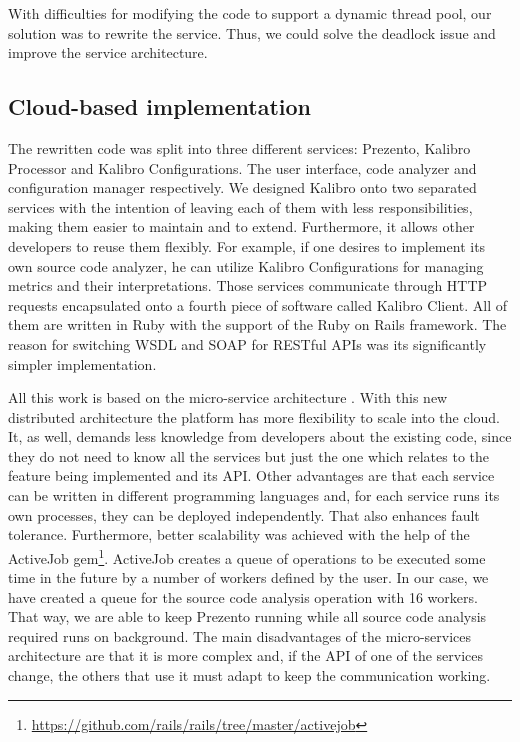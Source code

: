 With difficulties for modifying the code to support a dynamic thread pool, our
solution was to rewrite the service. Thus, we could solve the deadlock issue
and improve the service architecture.

\subsection{Cloud-based implementation}
\label{subsec:cloud-based-implementation}

The rewritten code was split into three different services: Prezento, Kalibro Processor and Kalibro Configurations. The user interface, code analyzer and configuration manager respectively. We designed Kalibro onto two separated services with the intention of leaving each of them with less responsibilities, making them easier to maintain and to extend. Furthermore, it allows other developers to reuse them flexibly. For example, if one desires to implement its own source code analyzer, he can utilize Kalibro Configurations for managing metrics and their interpretations. Those services communicate through HTTP requests encapsulated onto a fourth piece of software called Kalibro Client. All of them are written in Ruby with the support of the Ruby on Rails framework. The reason for switching WSDL and SOAP for RESTful APIs was its significantly simpler implementation.

All this work is based on the micro-service architecture \cite{namiot2014micro}. With this new distributed architecture the platform has more flexibility to scale into the cloud. It, as well, demands less knowledge from developers about the existing code, since they do not need to know all the services but just the one which relates to the feature being implemented and its API. Other advantages are that each service can be written in different programming languages and, for each service runs its own processes, they can be deployed independently. That also enhances fault tolerance. Furthermore, better scalability was achieved with the help of the ActiveJob gem\footnote{\url{https://github.com/rails/rails/tree/master/activejob}}. ActiveJob creates a queue of operations to be executed some time in the future by a number of workers defined by the user. In our case, we have created a queue for the source code analysis operation with 16 workers. That way, we are able to keep Prezento running while all source code analysis required runs on background. The main disadvantages of the micro-services architecture are that it is more complex and, if the API of one of the services change, the others that use it must adapt to keep the communication working.

